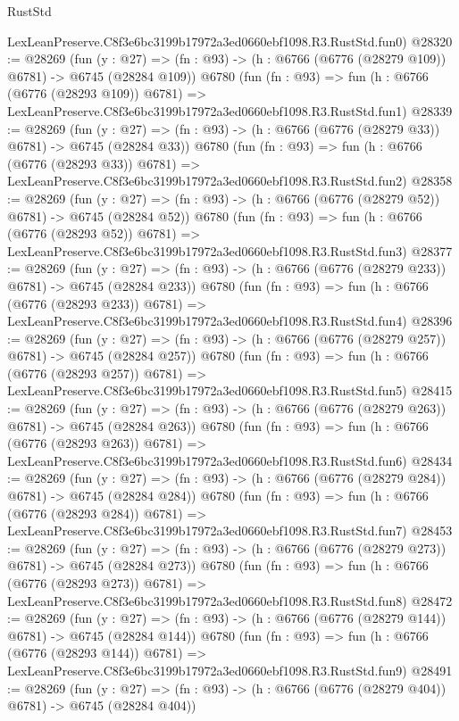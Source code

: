 \begin{lexlean}{RustStd}
\begin{coremodule}
    LexLeanPreserve.C8f3e6bc3199b17972a3ed0660ebf1098.R3.RustStd.fun0)
@28320 := @28269
    (fun (y : @27) => (fn : @93) -> (h : @6766 (@6776 (@28279 @109)) @6781) -> @6745 (@28284 @109))
    @6780
    (fun (fn : @93) =>
    fun (h : @6766 (@6776 (@28293 @109)) @6781) =>
    LexLeanPreserve.C8f3e6bc3199b17972a3ed0660ebf1098.R3.RustStd.fun1)
@28339 := @28269
    (fun (y : @27) => (fn : @93) -> (h : @6766 (@6776 (@28279 @33)) @6781) -> @6745 (@28284 @33))
    @6780
    (fun (fn : @93) =>
    fun (h : @6766 (@6776 (@28293 @33)) @6781) =>
    LexLeanPreserve.C8f3e6bc3199b17972a3ed0660ebf1098.R3.RustStd.fun2)
@28358 := @28269
    (fun (y : @27) => (fn : @93) -> (h : @6766 (@6776 (@28279 @52)) @6781) -> @6745 (@28284 @52))
    @6780
    (fun (fn : @93) =>
    fun (h : @6766 (@6776 (@28293 @52)) @6781) =>
    LexLeanPreserve.C8f3e6bc3199b17972a3ed0660ebf1098.R3.RustStd.fun3)
@28377 := @28269
    (fun (y : @27) => (fn : @93) -> (h : @6766 (@6776 (@28279 @233)) @6781) -> @6745 (@28284 @233))
    @6780
    (fun (fn : @93) =>
    fun (h : @6766 (@6776 (@28293 @233)) @6781) =>
    LexLeanPreserve.C8f3e6bc3199b17972a3ed0660ebf1098.R3.RustStd.fun4)
@28396 := @28269
    (fun (y : @27) => (fn : @93) -> (h : @6766 (@6776 (@28279 @257)) @6781) -> @6745 (@28284 @257))
    @6780
    (fun (fn : @93) =>
    fun (h : @6766 (@6776 (@28293 @257)) @6781) =>
    LexLeanPreserve.C8f3e6bc3199b17972a3ed0660ebf1098.R3.RustStd.fun5)
@28415 := @28269
    (fun (y : @27) => (fn : @93) -> (h : @6766 (@6776 (@28279 @263)) @6781) -> @6745 (@28284 @263))
    @6780
    (fun (fn : @93) =>
    fun (h : @6766 (@6776 (@28293 @263)) @6781) =>
    LexLeanPreserve.C8f3e6bc3199b17972a3ed0660ebf1098.R3.RustStd.fun6)
@28434 := @28269
    (fun (y : @27) => (fn : @93) -> (h : @6766 (@6776 (@28279 @284)) @6781) -> @6745 (@28284 @284))
    @6780
    (fun (fn : @93) =>
    fun (h : @6766 (@6776 (@28293 @284)) @6781) =>
    LexLeanPreserve.C8f3e6bc3199b17972a3ed0660ebf1098.R3.RustStd.fun7)
@28453 := @28269
    (fun (y : @27) => (fn : @93) -> (h : @6766 (@6776 (@28279 @273)) @6781) -> @6745 (@28284 @273))
    @6780
    (fun (fn : @93) =>
    fun (h : @6766 (@6776 (@28293 @273)) @6781) =>
    LexLeanPreserve.C8f3e6bc3199b17972a3ed0660ebf1098.R3.RustStd.fun8)
@28472 := @28269
    (fun (y : @27) => (fn : @93) -> (h : @6766 (@6776 (@28279 @144)) @6781) -> @6745 (@28284 @144))
    @6780
    (fun (fn : @93) =>
    fun (h : @6766 (@6776 (@28293 @144)) @6781) =>
    LexLeanPreserve.C8f3e6bc3199b17972a3ed0660ebf1098.R3.RustStd.fun9)
@28491 := @28269
    (fun (y : @27) => (fn : @93) -> (h : @6766 (@6776 (@28279 @404)) @6781) -> @6745 (@28284 @404))

\end{coremodule}
\end{lexlean}
